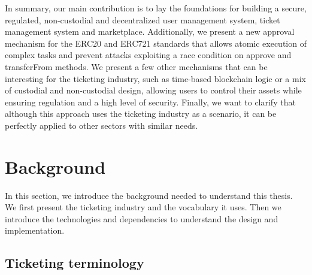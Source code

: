 \documentclass[a4paper,11pt,oneside]{report}
\begin{document}
In summary, our main contribution is to lay the foundations for building a secure, regulated, non-custodial and decentralized user management system, ticket management system and marketplace. Additionally, we present a new approval mechanism for the ERC20 and ERC721 standards that allows atomic execution of complex tasks and prevent attacks exploiting a race condition on approve and transferFrom methods. We present a few other mechanisms that can be interesting for the ticketing industry, such as time-based blockchain logic or a mix of custodial and non-custodial design, allowing users to control their assets while ensuring regulation and a high level of security. Finally, we want to clarify that although this approach uses the ticketing industry as a scenario, it can be perfectly applied to other sectors with similar needs.

\chapter{Background}
In this section, we introduce the background needed to understand this thesis. We first present the ticketing industry and the vocabulary it uses. Then we introduce the technologies and dependencies to understand the design and implementation.

\section{Ticketing terminology}
\label{sec:ticketing_terminology}
\end{document}
